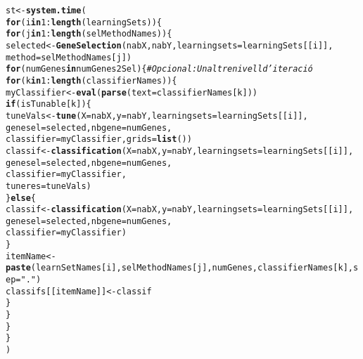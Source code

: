 \documentclass{article}\usepackage[]{graphicx}\usepackage[]{color}
\makeatletter
\newcommand{\hlnum}[1]{\textcolor[rgb]{0.686,0.059,0.569}{#1}}%
\newcommand{\hlstr}[1]{\textcolor[rgb]{0.192,0.494,0.8}{#1}}%
\newcommand{\hlcom}[1]{\textcolor[rgb]{0.678,0.584,0.686}{\textit{#1}}}%
\newcommand{\hlopt}[1]{\textcolor[rgb]{0,0,0}{#1}}%
\newcommand{\hlstd}[1]{\textcolor[rgb]{0.345,0.345,0.345}{#1}}%
\newcommand{\hlkwa}[1]{\textcolor[rgb]{0.161,0.373,0.58}{\textbf{#1}}}%
\newcommand{\hlkwb}[1]{\textcolor[rgb]{0.69,0.353,0.396}{#1}}%
\newcommand{\hlkwc}[1]{\textcolor[rgb]{0.333,0.667,0.333}{#1}}%
\newcommand{\hlkwd}[1]{\textcolor[rgb]{0.737,0.353,0.396}{\textbf{#1}}}%
\newenvironment{kframe}{%
 \def\at@end@of@kframe{}%
 \ifinner\ifhmode%
  \def\at@end@of@kframe{\end{minipage}}%
  \begin{minipage}{\columnwidth}%
 \fi\fi%
 \def\FrameCommand##1{\hskip\@totalleftmargin \hskip-\fboxsep
 \colorbox{shadecolor}{##1}\hskip-\fboxsep
     \hskip-\linewidth \hskip-\@totalleftmargin \hskip\columnwidth}%
 \MakeFramed {\advance\hsize-\width
   \@totalleftmargin\z@ \linewidth\hsize
   \@setminipage}}%
 {\par\unskip\endMakeFramed%
 \at@end@of@kframe}
\newenvironment{knitrout}{}{} %
\makeatother
\begin{document}
\begin{knitrout}
\begin{kframe}
\begin{alltt}
\hlstd{st} \hlkwb{<-} \hlkwd{system.time}\hlstd{(}
\hlkwa{for} \hlstd{(i} \hlkwa{in} \hlnum{1}\hlopt{:}\hlkwd{length}\hlstd{(learningSets))\{}
  \hlkwa{for} \hlstd{(j} \hlkwa{in} \hlnum{1}\hlopt{:}\hlkwd{length}\hlstd{(selMethodNames))\{}
      \hlstd{selected}  \hlkwb{<-} \hlkwd{GeneSelection}\hlstd{(nabX, nabY,} \hlkwc{learningsets} \hlstd{= learningSets[[i]],}
                                 \hlkwc{method} \hlstd{= selMethodNames[j])}
      \hlkwa{for} \hlstd{(numGenes} \hlkwa{in} \hlstd{numGenes2Sel)\{} \hlcom{# Opcional : Un altre nivell d'iteració}
        \hlkwa{for} \hlstd{(k} \hlkwa{in} \hlnum{1}\hlopt{:}\hlkwd{length}\hlstd{(classifierNames))\{}
          \hlstd{myClassifier} \hlkwb{<-} \hlkwd{eval}\hlstd{(}\hlkwd{parse}\hlstd{(}\hlkwc{text}\hlstd{=classifierNames[k]))}
          \hlkwa{if}\hlstd{(isTunable[k])\{}
               \hlstd{tuneVals} \hlkwb{<-} \hlkwd{tune} \hlstd{(}\hlkwc{X}\hlstd{=nabX,} \hlkwc{y}\hlstd{=nabY,} \hlkwc{learningsets}\hlstd{= learningSets[[i]],}
                                 \hlkwc{genesel}\hlstd{=selected,} \hlkwc{nbgene}\hlstd{=numGenes,}
                                \hlkwc{classifier} \hlstd{=myClassifier,}  \hlkwc{grids}\hlstd{=}\hlkwd{list}\hlstd{())}
               \hlstd{classif} \hlkwb{<-} \hlkwd{classification}\hlstd{(}\hlkwc{X} \hlstd{= nabX,} \hlkwc{y}\hlstd{=nabY,} \hlkwc{learningsets} \hlstd{= learningSets[[i]],}
                                         \hlkwc{genesel}\hlstd{=selected,} \hlkwc{nbgene}\hlstd{=numGenes,}
                                         \hlkwc{classifier}\hlstd{=myClassifier,}
                                         \hlkwc{tuneres}\hlstd{=tuneVals)}
             \hlstd{\}}\hlkwa{else}\hlstd{\{}
               \hlstd{classif} \hlkwb{<-} \hlkwd{classification}\hlstd{(}\hlkwc{X} \hlstd{= nabX,} \hlkwc{y}\hlstd{=nabY,} \hlkwc{learningsets} \hlstd{= learningSets[[i]],}
                                         \hlkwc{genesel}\hlstd{=selected,} \hlkwc{nbgene}\hlstd{=numGenes,}
                                         \hlkwc{classifier}\hlstd{=myClassifier)}
             \hlstd{\}}
          \hlstd{itemName}\hlkwb{<-} \hlkwd{paste}\hlstd{(learnSetNames[i], selMethodNames[j], numGenes, classifierNames[k],} \hlkwc{sep}\hlstd{=}\hlstr{"."}\hlstd{)}
          \hlstd{classifs[[itemName]]}\hlkwb{<-} \hlstd{classif}
        \hlstd{\}}
      \hlstd{\}}
    \hlstd{\}}
\hlstd{\}}
\hlstd{)}
\end{alltt}


{\ttfamily\noindent\color{warningcolor}{\#\# Warning in tune(X, y = as.numeric(y) - 1, learningsets = learningsets, genesel = genesel, : Combination of feature selection and hyperparameter tuning\\\#\#\ \ \ \ \ \ \ \ \ \ \ \ \ \ \ \ is subject to pessimistic bias and will be fixed in a future\\\#\#\ \ \ \ \ \ \ \ \ \ \ \ \ \ \ \ package version.}}


\end{kframe}
\end{knitrout}
\end{document}
